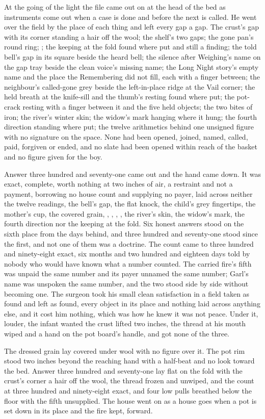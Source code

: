 At the going of the light the file came out on  at the head of the bed as instruments come out when a case is done and before the next is called. He went over the field by the place of each thing and left every gap a gap. The crust's gap with its corner standing a hair off the wool; the shelf's two gaps; the gone pan's round ring; ; the keeping at the fold found where put and still a finding; the told bell's gap in its square beside the heard bell; the silence after Weighing's name on the gap tray beside the clean voice's missing name; the Long Night story's empty name and the place the Remembering did not fill, each with a finger between; the neighbour's called-gone grey beside the left-in-place ridge at the Vail corner; the held breath at the knife-sill and the thumb's resting found where put; the pot-crack resting with a finger between it and the five held objects; the two bites of iron; the river's winter skin; the widow's mark hanging where it hung; the fourth direction standing where put; the twelve arithmetics behind one unsigned figure with no signature on the space. None had been opened, joined, named, called, paid, forgiven or ended, and no slate had been opened within reach of the basket and no figure given for the boy.

Answer three hundred and seventy-one came out and the hand came down. It was exact, complete, worth nothing at two inches of air, a restraint and not a payment, borrowing no house count and supplying no payer, laid across neither the twelve readings, the bell's gap, the flat knock, the child's grey fingertips, the mother's cup, the covered grain, , , , , the river's skin, the widow's mark, the fourth direction nor the keeping at the fold. Six honest answers stood on the sixth place from the days behind, and three hundred and seventy-one stood since the first, and not one of them was a doctrine. The count came to three hundred and ninety-eight exact, six months and two hundred and eighteen days told by nobody who would have known what a number counted. The carried fire's fifth was unpaid the same number and its payer unnamed the same number; Garl's name was unspoken the same number, and the two stood side by side without becoming one. The surgeon took his small clean satisfaction in a field taken as found and left as found, every object in its place and nothing laid across anything else, and it cost him nothing, which was how he knew it was not peace. Under it, louder, the infant wanted the crust lifted two inches, the thread at his mouth wiped and a hand on the pot board's handle, and got none of the three.

The dressed grain lay covered under wool with no figure over it. The pot rim stood two inches beyond the reaching hand with a half-beat and no look toward the bed. Answer three hundred and seventy-one lay flat on the fold with the crust's corner a hair off the wool, the thread frozen and unwiped, and the count at three hundred and ninety-eight exact, and four low pulls breathed below the floor with the fifth unsupplied. The house went on as a house goes when a pot is set down in its place and the fire kept, forward.
